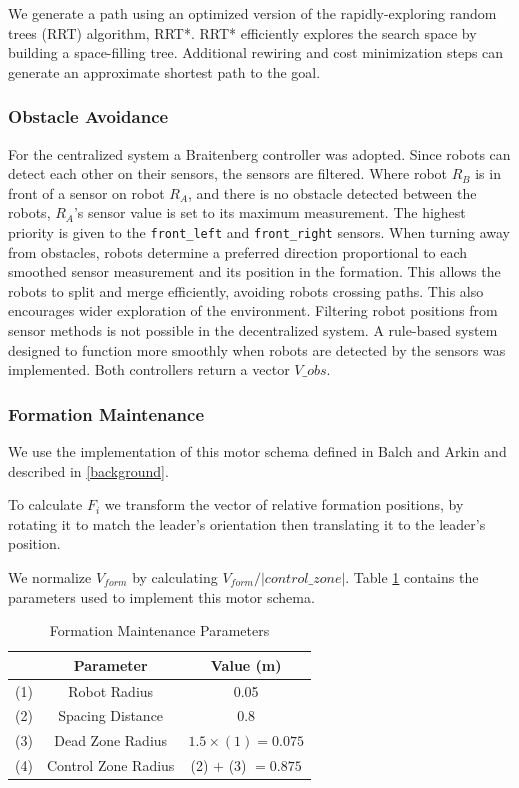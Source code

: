 \documentclass[letterpaper, 10 pt, conference]{ieeeconf}  %
\begin{document}
We generate a path using an optimized version of the rapidly-exploring random trees (RRT) algorithm, RRT*. RRT* efficiently explores the search space by building a space-filling tree. Additional rewiring and cost minimization steps can generate an approximate shortest path to the goal. 

\subsubsection*{Obstacle Avoidance}
\label{subsubsection: obs avoid}

For the centralized system a Braitenberg controller was adopted. Since robots can detect each other on their sensors, the sensors are filtered. Where robot $R_B$ is in front of a sensor on robot $R_A$, and there is no obstacle detected between the robots, $R_A$'s sensor value is set to its maximum measurement.
The highest priority is given to the \texttt{front\_left} and \texttt{front\_right} sensors. When turning away from obstacles, robots determine a preferred direction proportional to each smoothed sensor measurement and its position in the formation. This allows the robots to split and merge efficiently, avoiding robots crossing paths. This also encourages wider exploration of the environment.
Filtering robot positions from sensor methods is not possible in the decentralized system. A rule-based system designed to function more smoothly when robots are detected by the sensors was implemented.
Both controllers return a vector $V\_obs$.

\subsubsection*{Formation Maintenance}

We use the implementation of this motor schema defined in Balch and Arkin and described in \ref{background}. 

To calculate $F_i$ we transform the vector of relative formation positions, by rotating it to match the leader's orientation then translating it to the leader's position.

We normalize $V_{form}$ by calculating $V_{form}/|control\_zone|$. Table \ref{table_formation} contains the parameters used to implement this motor schema.

\begin{table}[h]
\begin{center}
\begin{tabular}{|c|c|c|}
\hline
& Parameter & Value (m) \\
\hline
(1) & Robot Radius             & 0.05 \\
(2) & Spacing Distance        & 0.8 \\
(3) & Dead Zone Radius      & $1.5 \times (1) = 0.075$ \\
(4) & Control Zone Radius    & (2) $+$ (3) $=0.875$ \\
\hline
\end{tabular}
\end{center}
\caption{Formation Maintenance Parameters}
\label{table_formation}
\end{table}
\end{document}

